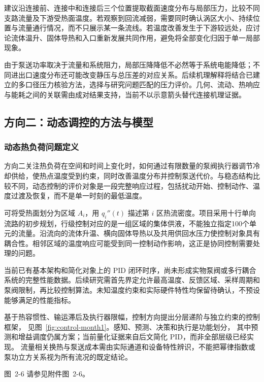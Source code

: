 \documentclass[UTF8]{midterm}
\makeatletter
\newcommand{\submissionnumber}[1]{\def\@currentlabel{#1}}
\makeatother
\begin{document}
建议沿连接前、连接中和连接后三个位置提取截面速度分布与局部压力，比较不同支路流量及下游受热面温度。若观察到回流减弱，需要同时确认涡区大小、持续位置与流量通行情况，而不只展示某一条流线。若温度改善发生于下游较远处，应讨论流体温升、固体导热和入口重新发展共同作用，避免将全部变化归因于单一局部现象。

由于泵送功率取决于流量和系统阻力，局部压降降低不必然等于系统电能降低；不同进出口速度分布还可能改变静压与总压差的对应关系。后续机理解释将结合已建立的多口径压力核验方法，选择与研究问题匹配的压力评价。几何、流动、热响应与能耗之间的关联需由成对结果支持，当前不以示意箭头替代连接机理证据。

\subsection{方向二：动态调控的方法与模型}
\subsubsection{动态热负荷问题定义}
方向二关注热负荷在空间和时间上变化时，如何通过有限数量的泵阀执行器调节冷却供给，使热点温度受到约束，同时改善温度分布并控制泵送代价。与稳态结构比较不同，动态控制的评价对象是一段完整响应过程，包括扰动开始、控制动作、温度过渡及恢复，而不是单一时刻的最低温度。

可将受热面划分为区域 $A_i$，用 $q_i''(t)$ 描述第 $i$ 区热流密度。项目采用十行单向流路的初步规划，行级控制对应的是一组区域的集体供液，不能独立指定100个单元的流量。沿流向的流体升温、横向固体导热以及共用供回水压力使控制对象具有耦合性。相邻区域的温度响应可能受到同一控制动作影响，这正是协同控制需要处理的问题。

当前已有基本架构和简化对象上的 PID 闭环时序，尚未形成实物泵阀或多行耦合系统的完整性能数据。后续研究需首先界定允许最高温度、反馈区域、采样周期和泵阀限制，再比较控制算法。未知温度约束和实际硬件特性均保留待确认，不预设能够满足的性能指标。


基于热容惯性、输运滞后及执行器限幅，控制方向提出分层递阶与独立约束的控制框架，
见图~\ref{fig:control-month1}。感知、预测、决策和执行是功能划分，
其中预测和增益调度仍属方案；当前量化证据来自后文简化 PID，而非全部层级已经实现。
流量相关换热与泵送成本需由实际通道和设备特性辨识，不能把幂律指数或泵功立方关系视为所有流况的既定结论。


\par\noindent \begingroup\submissionnumber{2-6}\label{fig:control-month1}\endgroup 图~2-6 请参见附件图~2-6。\par
\end{document}
